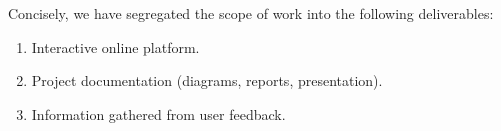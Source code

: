 Concisely, we have segregated the scope of work into the following deliverables:

\begin{enumerate}
	\item Interactive online platform.
	\item Project documentation (diagrams, reports, presentation).
	\item Information gathered from user feedback.
\end{enumerate}
















\clearpage
